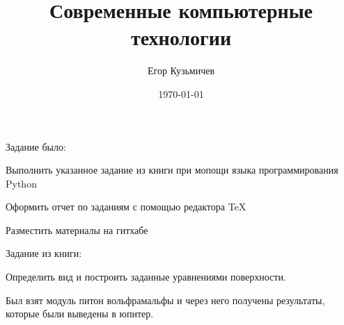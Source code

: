 \documentclass[a4paper,12pt]{article}
\author{Егор Кузьмичев}
\title{Современные компьютерные технологии}
\date{\today}
\begin{document}

\maketitle

Задание было:

{Выполнить указанное задание из книги при мопощи языка программирования Python}

{Оформить отчет по заданиям с помощью редактора \TeX}

{Разместить материалы на гитхабе}

Задание из книги:

Определить вид и построить заданные уравнениями поверхности.

Был взят модуль питон вольфрамальфы и через него получены результаты, которые были выведены в юпитер.
\end{document}

